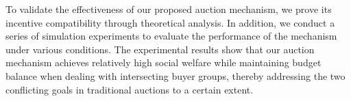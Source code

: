 To validate the effectiveness of our proposed auction mechanism, we prove its incentive compatibility through theoretical analysis. In addition, we conduct a series of simulation experiments to evaluate the performance of the mechanism under various conditions. The experimental results show that our auction mechanism achieves relatively high social welfare while maintaining budget balance when dealing with intersecting buyer groups, thereby addressing the two conflicting goals in traditional auctions to a certain extent.
